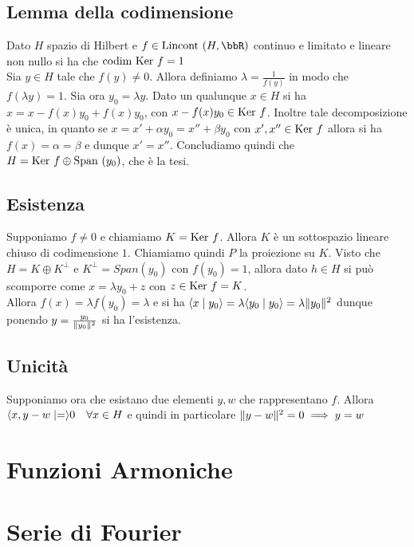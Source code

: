 \documentclass[a4paper,NoNotes,GeneralMath]{stdmdoc}
\newcommand{\Lincont}{\text{Lincont }}
\newcommand{\codim}{\text{codim }}
\begin{document}
	\subsection*{Lemma della codimensione}
	Dato $H$ spazio di Hilbert e $f \in \Lincont(H, \bbR)$ continuo e limitato e lineare non nullo si ha che $\codim \Ker f = 1$ \\
	
	Sia $y \in H$ tale che $f(y) \neq 0$. Allora definiamo $\lambda = \frac{1}{f(y)}$ in modo che $f(\lambda y) = 1$. Sia ora $y_0 = \lambda y$. Dato un qualunque $x \in H$ si ha $x = x - f(x)y_0 + f(x)y_0$, con $x - f(x)y_0 \in \mbox{Ker } f$. Inoltre tale decomposizione è unica, in quanto se $x = x' + \alpha y_0 = x'' + \beta y_0$ con $x', x'' \in \mbox{Ker } f$ allora si ha $f(x) = \alpha = \beta$ e dunque $x' = x''$. Concludiamo quindi che $H = \mbox{Ker } f \oplus \mbox{Span }(y_0)$, che è la tesi.
	
	\subsection*{Esistenza}
	Supponiamo $f \neq 0$ e chiamiamo $K = \mbox{Ker } f$. Allora $K$ è un sottospazio lineare chiuso di codimensione $1$. Chiamiamo quindi $P$ la proiezione su $K$. Visto che $H = K \oplus K^\bot$ e $K^\bot = Span(y_0)$ con $f(y_0) = 1$, allora dato $h \in H$ si può scomporre come $x = \lambda y_0 + z$ con $z \in \mbox{Ker } f = K$. \\
	Allora $f(x) = \lambda f(y_0) = \lambda$ e si ha $\langle x \mid y_0 \rangle = \lambda \langle y_0 \mid y_0 \rangle = \lambda \| {y_0} \|^2$ dunque ponendo $y = \frac{y_0}{\| {y_0} \|^2}$ si ha l'esistenza. \\
	
	\subsection*{Unicità}
	Supponiamo ora che esistano due elementi $y, w$ che rappresentano $f$. Allora $\langle x, y - w \mid = \rangle 0 \quad \forall x \in H$ e quindi in particolare $\| {y - w} \|^2 = 0 \implies y = w$
	
	\section*{Funzioni Armoniche}
	
	\section*{Serie di Fourier}
	
\end{document}

